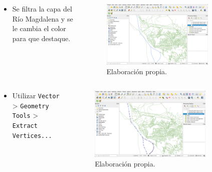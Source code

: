 \documentclass[17pt, t, lualatex]{beamer}
\begin{document}
\begin{frame}[allowframebreaks]
  \begin{columns}
    \begin{column}{.3\textwidth}
      \begin{itemize}
        \item Se filtra la capa del Río Magdalena y se le cambia el color para que destaque.
      \end{itemize}
    \end{column}

    \begin{column}{.7\textwidth}
      \begin{figure}[ht]
        \centering
        \includegraphics[width=0.8\textwidth]{img/QGIS-2.png}
        \caption{Elaboración propia.}
      \end{figure}
    \end{column}
  \end{columns}


  \begin{columns}
    \begin{column}{.3\textwidth}
      \begin{itemize}
        \item Utilizar \texttt{Vector} > \texttt{Geometry Tools} > \texttt{Extract Vertices...}
      \end{itemize}
    \end{column}

    \begin{column}{.7\textwidth}
      \begin{figure}[ht]
        \centering
        \includegraphics[width=0.8\textwidth]{img/QGIS-3.png}
        \caption{Elaboración propia.}
      \end{figure}
    \end{column}
  \end{columns}


\end{frame}
\end{document}
